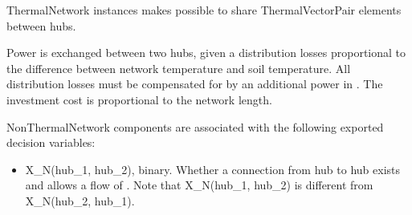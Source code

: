 \documentclass[letterpaper,10pt,english]{sphinxmanual}
\begin{document}
\begin{fulllineitems}
\label{\detokenize{generated/tamos.network.ThermalNetwork:tamos.network.ThermalNetwork}}
\pysigstartsignatures
{}
\pysigstopsignatures{}

\begin{fulllineitems}
\label{\detokenize{generated/tamos.network.ThermalNetwork:tamos.network.ThermalNetwork.__init__}}
\pysigstartsignatures
{}
\pysigstopsignatures
\sphinxAtStartPar
ThermalNetwork instances makes possible to share ThermalVectorPair elements between hubs.

\sphinxAtStartPar
Power is exchanged between two hubs, given a distribution losses proportional to the difference between
network temperature and soil temperature.
All distribution losses must be compensated for by an additional power in .
The investment cost is proportional to the network length.

\sphinxAtStartPar
NonThermalNetwork components are associated with the following exported decision variables:
\begin{itemize}
\item {} 
\sphinxAtStartPar
X\_N(hub\_1, hub\_2), binary.
Whether a connection from hub  to hub  exists and allows a flow of .
Note that X\_N(hub\_1, hub\_2) is different from X\_N(hub\_2, hub\_1).


\end{itemize}
\end{fulllineitems}
\end{fulllineitems}
\end{document}
